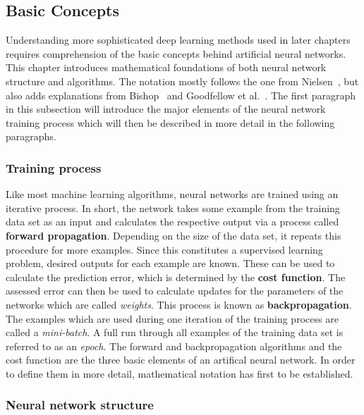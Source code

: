 \subsection{Basic Concepts}
\label{sub:dl_concepts}

Understanding more sophisticated deep learning methods used in later
chapters requires comprehension of the basic concepts behind artificial
neural networks.
This chapter introduces mathematical foundations of both neural network
structure and algorithms.
The notation mostly follows the one from Nielsen~\cite{Nielsen2015}, but also
adds explanations from Bishop~\cite{Bishop2006} and Goodfellow et al.~\cite{Goodfellow2016}.
The first paragraph in this subsection will introduce the major elements
of the neural network training process which will then be described in more
detail in the following paragraphs.

\subsubsection{Training process}

Like most machine learning algorithms, neural networks are trained using an iterative process.
In short, the network takes some example from the training data set as an input 
and calculates the respective output via a process called 
\textbf{forward propagation}.
Depending on the size of the data set, it repeats this procedure for more 
examples.
Since this constitutes a supervised learning problem, desired outputs for
each example are known.
These can be used to calculate the prediction error, which is determined by the
\textbf{cost function}.
The assessed error can then be used to calculate updates for the parameters of
the networks which are called \textit{weights}.
This process is known as \textbf{backpropagation}.
The examples which are used during one iteration of the training process are
called a \textit{mini-batch}.
A full run through all examples of the training data set is referred to as an
\textit{epoch}.
The forward and backpropagation algorithms and the cost function are the three
basic elements of an artifical neural network. 
In order to define them in more detail, mathematical notation has first to be
established.

\subsubsection{Neural network structure}

